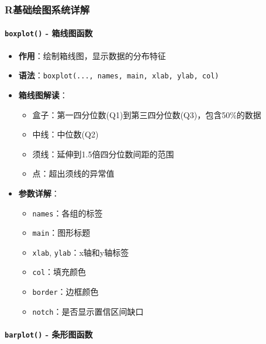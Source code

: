 \documentclass[
  twoside]{book}
\providecommand{\tightlist}{%
  \setlength{\itemsep}{0pt}\setlength{\parskip}{0pt}}
\begin{document}
\hypertarget{rux57faux7840ux7ed8ux56feux7cfbux7edfux8be6ux89e3}{%
\subsubsection{R基础绘图系统详解}\label{rux57faux7840ux7ed8ux56feux7cfbux7edfux8be6ux89e3}}

\hypertarget{boxplot---ux7bb1ux7ebfux56feux51fdux6570}{%
\paragraph{\texorpdfstring{\texttt{boxplot()} - 箱线图函数}{boxplot() - 箱线图函数}}\label{boxplot---ux7bb1ux7ebfux56feux51fdux6570}}

\begin{itemize}
\tightlist
\item
  \textbf{作用}：绘制箱线图，显示数据的分布特征
\item
  \textbf{语法}：\texttt{boxplot(...,\ names,\ main,\ xlab,\ ylab,\ col)}
\item
  \textbf{箱线图解读}：

  \begin{itemize}
  \tightlist
  \item
    盒子：第一四分位数(Q1)到第三四分位数(Q3)，包含50\%的数据
  \item
    中线：中位数(Q2)
  \item
    须线：延伸到1.5倍四分位数间距的范围
  \item
    点：超出须线的异常值
  \end{itemize}
\item
  \textbf{参数详解}：

  \begin{itemize}
  \tightlist
  \item
    \texttt{names}：各组的标签
  \item
    \texttt{main}：图形标题
  \item
    \texttt{xlab}, \texttt{ylab}：x轴和y轴标签
  \item
    \texttt{col}：填充颜色
  \item
    \texttt{border}：边框颜色
  \item
    \texttt{notch}：是否显示置信区间缺口
  \end{itemize}
\end{itemize}

\hypertarget{barplot---ux6761ux5f62ux56feux51fdux6570}{%
\paragraph{\texorpdfstring{\texttt{barplot()} - 条形图函数}{barplot() - 条形图函数}}\label{barplot---ux6761ux5f62ux56feux51fdux6570}}
\end{document}
